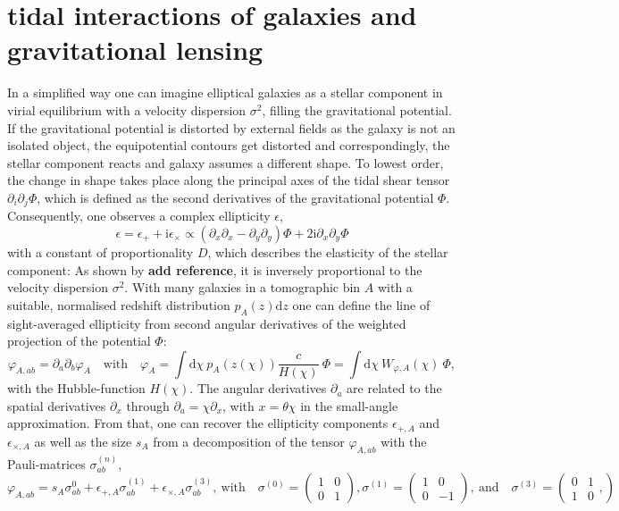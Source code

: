\documentclass[a4paper,fleqn,usenatbib]{mnras}
\def\spirou#1{{\bf #1}}
\newcommand{\dd}{\mathrm{d}}
\newcommand{\ci}{\mathrm{i}}
\begin{document}
\section{tidal interactions of galaxies and gravitational lensing}\label{sect_tidal}
In a simplified way one can imagine elliptical galaxies as a stellar component in virial equilibrium with a velocity dispersion $\sigma^2$, filling the gravitational potential. If the gravitational potential is distorted by external fields as the galaxy is not an isolated object, the equipotential contours get distorted and correspondingly, the stellar component reacts and galaxy assumes a different shape. To lowest order, the change in shape takes place along the principal axes of the tidal shear tensor $\partial_i\partial_j\Phi$, which is defined as the second derivatives of the gravitational potential $\Phi$. Consequently, one observes a complex ellipticity $\epsilon$,
\begin{equation}
\epsilon = \epsilon_+ + \ci\epsilon_\times \propto 
(\partial_x\partial_x-\partial_y\partial_y)\Phi +2\ci\partial_x\partial_y\Phi
\end{equation}
with a constant of proportionality $D$, which describes the elasticity of the stellar component: As shown by \spirou{add reference}, it is inversely proportional to the velocity dispersion $\sigma^2$. With many galaxies in a tomographic bin $A$ with a suitable, normalised redshift distribution $p_A(z)\dd z$ one can define the line of sight-averaged ellipticity from second angular derivatives of the weighted projection of the potential $\Phi$:
\begin{equation}
\varphi_{A,ab} = \partial_a\partial_b\varphi_A
\quad\mathrm{with}\quad
\varphi_A = \int\dd\chi\:p_A(z(\chi))\frac{c}{H(\chi)}\:\Phi = \int\dd\chi\:W_{\varphi,A}(\chi)\:\Phi,
\end{equation}
with the Hubble-function $H(\chi)$. The angular derivatives $\partial_a$ are related to the spatial derivatives $\partial_x$ through $\partial_a = \chi\partial_x$, with $x=\theta\chi$ in the small-angle approximation. From that, one can recover the ellipticity components $\epsilon_{+,A}$ and $\epsilon_{\times,A}$ as well as the size $s_A$ from a decomposition of the tensor $\varphi_{A,ab}$ with the Pauli-matrices $\sigma_{ab}^{(n)}$,
\begin{equation}
\varphi_{A,ab} = s_A\sigma^{0}_{ab} + \epsilon_{+,A}\sigma^{(1)}_{ab} + \epsilon_{\times,A}\sigma^{(3)}_{ab},
\mathrm{~with}\quad
\sigma^{(0)} = \left(
\begin{array}{cc}
1 & 0 \\ 0 & 1
\end{array}
\right),
\sigma^{(1)} = \left(
\begin{array}{cc}
1 & 0 \\ 0 & -1
\end{array}
\right),
\mathrm{~and}\quad
\sigma^{(3)} = \left(
\begin{array}{cc}
0 & 1 \\ 1 & 0
\end{array},
\right)
\end{equation}
\end{document}
